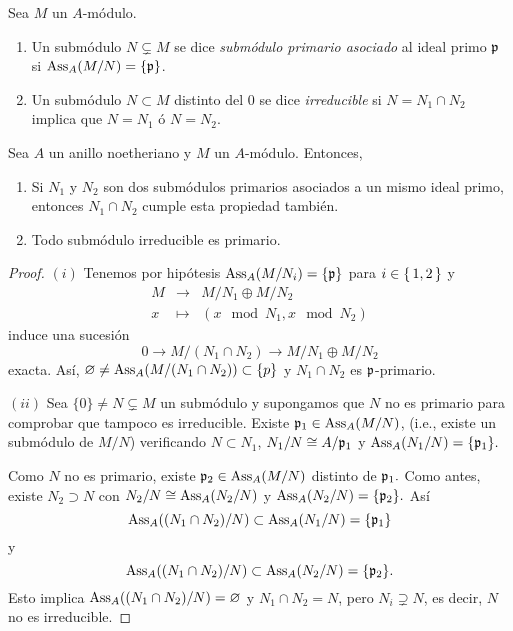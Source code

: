 \documentclass[../main.tex]{subfiles}
\begin{document}
	\begin{definition} Sea $M$ un $A$-módulo. \begin{enumerate}
			\item Un submódulo $N\varsubsetneq M$ se dice \textit{submódulo primario asociado} al ideal primo $\mathfrak{p}$ si $\text{Ass}_A(M/N)=\{\mathfrak{p}\}$.
			\item Un submódulo $N\subset M$ distinto del $0$ se dice \textit{irreducible} si $N=N_1\cap N_2$ implica que $N=N_1$ ó $N=N_2$.
		\end{enumerate}
	\end{definition}
	\begin{lemma}
		Sea $A$ un anillo noetheriano y $M$ un $A$-módulo. Entonces,\begin{enumerate}
			\item Si $N_1$ y $N_2$ son dos submódulos primarios asociados a un mismo ideal primo, entonces $N_1\cap N_2$ cumple esta propiedad también.
			\item Todo submódulo irreducible es primario.
		\end{enumerate}
	\end{lemma}
	
	\begin{proof}
		$(i)$ Tenemos por hipótesis $\text{Ass}_A(M/N_i)=\{\mathfrak{p}\}$ para $i\in\set{1,2}$ y 
		$$\begin{array}{rcl}
		M&\longrightarrow& M/N_1\oplus M/N_2\\
		x&\longmapsto&(x\mod N_1,x\mod N_2) 
		\end{array}$$
		induce una sucesión
		$$0\longrightarrow M/(N_1\cap N_2)\longrightarrow M/N_1\oplus M/N_2$$
		exacta. Así, $\varnothing\neq \text{Ass}_A(M/(N_1\cap N_2))\subset \{p\}$ y $N_1\cap N_2$ es $\mathfrak{p}$-primario.
		
		$(ii)$ Sea $\{0\}\neq N\subsetneq M$ un submódulo y supongamos que $N$ no es primario para comprobar que tampoco es irreducible. Existe $\mathfrak{p}_1\in\text{Ass}_A(M/N)$, (i.e., existe un submódulo de $M/N$) verificando $N\subset N_1$, $N_1/N\cong A/{\mathfrak{p}_1}$ y $\text{Ass}_A(N_1/N)=\{\mathfrak{p}_1\}.$
		
		Como $N$ no es primario, existe $\mathfrak{p}_2\in\text{Ass}_A(M/N)$ distinto de $\mathfrak{p}_1.$ Como antes, existe $N_2\supset N$ con $N_2/N\cong\text{Ass}_A(N_2/N)$ y $\text{Ass}_A(N_2/N)=\{\mathfrak{p}_2\}.$ Así
		$$\text{Ass}_A((N_1\cap N_2)/N)\subset\text{Ass}_A(N_1/N)=\{\mathfrak{p}_1\}$$
		y
		$$\text{Ass}_A((N_1\cap N_2)/N)\subset\text{Ass}_A(N_2/N)=\{\mathfrak{p}_2\}.$$
		Esto implica $\text{Ass}_A((N_1\cap N_2)/N)=\varnothing$ y $N_1\cap N_2=N$, pero $N_i\supsetneq N$, es decir, $N$ no es irreducible.
	\end{proof}
	
\end{document}
